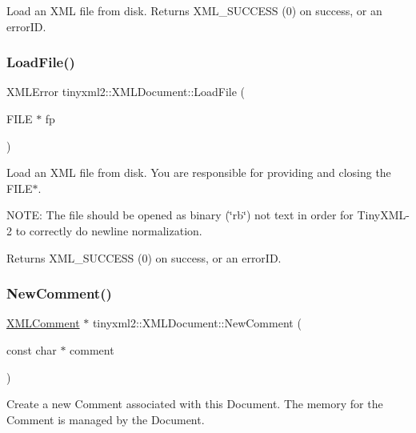 Load an X\+ML file from disk. Returns X\+M\+L\+\_\+\+S\+U\+C\+C\+E\+SS (0) on success, or an error\+ID. \mbox{\label{classtinyxml2_1_1_x_m_l_document_a5f1d330fad44c52f3d265338dd2a6dc2}} 
\subsubsection{\texorpdfstring{Load\+File()}{LoadFile()}\hspace{0.1cm}{\footnotesize\ttfamily [2/2]}}
{\footnotesize\ttfamily X\+M\+L\+Error tinyxml2\+::\+X\+M\+L\+Document\+::\+Load\+File (\begin{DoxyParamCaption}\item[{F\+I\+LE $\ast$}]{fp }\end{DoxyParamCaption})}

Load an X\+ML file from disk. You are responsible for providing and closing the F\+I\+L\+E$\ast$.

N\+O\+TE\+: The file should be opened as binary (\char`\"{}rb\char`\"{}) not text in order for Tiny\+X\+M\+L-\/2 to correctly do newline normalization.

Returns X\+M\+L\+\_\+\+S\+U\+C\+C\+E\+SS (0) on success, or an error\+ID. \mbox{\label{classtinyxml2_1_1_x_m_l_document_a386df0befd06aadb5e0cd21381aa955a}} 
\subsubsection{\texorpdfstring{New\+Comment()}{NewComment()}}
{\footnotesize\ttfamily \mbox{\hyperlink{classtinyxml2_1_1_x_m_l_comment}{X\+M\+L\+Comment}} $\ast$ tinyxml2\+::\+X\+M\+L\+Document\+::\+New\+Comment (\begin{DoxyParamCaption}\item[{const char $\ast$}]{comment }\end{DoxyParamCaption})}

Create a new Comment associated with this Document. The memory for the Comment is managed by the Document. \mbox{\label{classtinyxml2_1_1_x_m_l_document_ae519030c0262fa2daff8993681990e16}} 
